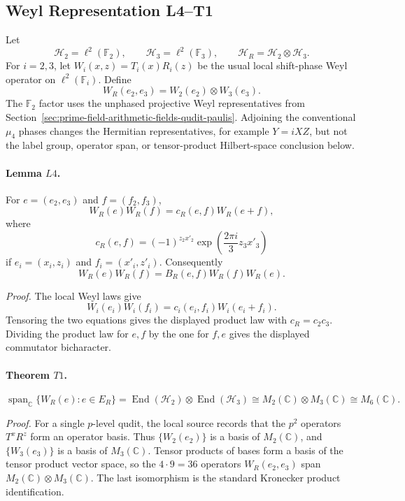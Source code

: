 \subsection{Weyl Representation L4--T1}

Let
\[
  \mathcal H_2=\ell^2(\mathbb F_2),\qquad
  \mathcal H_3=\ell^2(\mathbb F_3),\qquad
  \mathcal H_R=\mathcal H_2\otimes\mathcal H_3.
\]
For \(i=2,3\), let \(W_i(x,z)=T_i(x)R_i(z)\) be the usual local
shift-phase Weyl operator on \(\ell^2(\mathbb F_i)\).  Define
\[
  W_R(e_2,e_3)=W_2(e_2)\otimes W_3(e_3).
\]
The \(\mathbb F_2\) factor uses the unphased projective Weyl representatives
from Section~\ref{sec:prime-field-arithmetic-fields-qudit-paulis}.  Adjoining
the conventional \(\mu_4\) phases changes the Hermitian representatives, for
example \(Y=iXZ\), but not the label group, operator span, or tensor-product
Hilbert-space conclusion below.

\paragraph{Lemma \(L4\).}
For \(e=(e_2,e_3)\) and \(f=(f_2,f_3)\),
\[
  W_R(e)W_R(f)=c_R(e,f)W_R(e+f),
\]
where
\[
  c_R(e,f)=(-1)^{z_2x'_2}
  \exp\!\left(\frac{2\pi i}{3}z_3x'_3\right)
\]
if \(e_i=(x_i,z_i)\) and \(f_i=(x'_i,z'_i)\).  Consequently
\[
  W_R(e)W_R(f)=B_R(e,f)W_R(f)W_R(e).
\]

\emph{Proof.}
The local Weyl laws give
\[
  W_i(e_i)W_i(f_i)=c_i(e_i,f_i)W_i(e_i+f_i).
\]
Tensoring the two equations gives the displayed product law with
\(c_R=c_2c_3\).  Dividing the product law for \(e,f\) by the one for \(f,e\)
gives the displayed commutator bicharacter.

\paragraph{Theorem \(T1\).}
\[
  \operatorname{span}_{\mathbb C}\{W_R(e):e\in E_R\}
  =
  \operatorname{End}(\mathcal H_2)\otimes\operatorname{End}(\mathcal H_3)
  \cong M_2(\mathbb C)\otimes M_3(\mathbb C)
  \cong M_6(\mathbb C).
\]

\emph{Proof.}
For a single \(p\)-level qudit, the local source records that the \(p^2\)
operators \(T^xR^z\) form an operator basis.  Thus
\(\{W_2(e_2)\}\) is a basis of \(M_2(\mathbb C)\), and \(\{W_3(e_3)\}\) is a
basis of \(M_3(\mathbb C)\).  Tensor products of bases form a basis of the
tensor product vector space, so the \(4\cdot9=36\) operators \(W_R(e_2,e_3)\)
span \(M_2(\mathbb C)\otimes M_3(\mathbb C)\).  The last isomorphism is the
standard Kronecker product identification.

